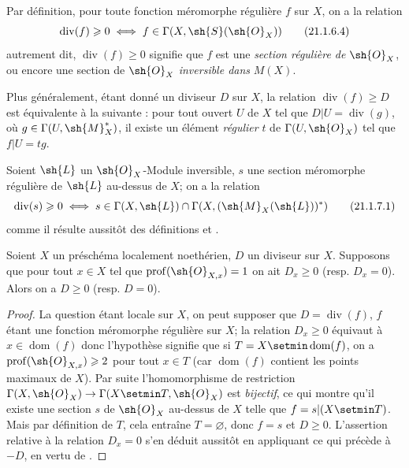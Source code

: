 Par définition, pour toute fonction méromorphe régulière $f$ sur $X$, on a la relation
\[
\label{IV.21.1.6.4}
  \operatorname{div}(f)\geq0 \iff f\in\Gamma(X,\sh{S}(\sh{O}_X))
  \tag{21.1.6.4}
\]
autrement dit, $\operatorname{div}(f)\geq0$ signifie que $f$ est une \emph{section régulière de} $\sh{O}_X$, ou encore une section de $\sh{O}_X$ \emph{inversible dans} $M(X)$.

Plus généralement, étant donné un diviseur $D$ sur $X$, la relation $\operatorname{div}(f)\geq D$ est équivalente à la suivante : pour tout ouvert $U$ de $X$ tel que $D|U=\operatorname{div}(g)$, où $g\in\Gamma(U,\sh{M}_X^*)$, il existe un élément \emph{régulier} $t$ de $\Gamma(U,\sh{O}_X)$ tel que $f|U=tg$.

\begin{env}[21.1.7]
\label{IV.21.1.7}
Soient $\sh{L}$ un $\sh{O}_X$-Module inversible, $s$ une section méromorphe régulière de $\sh{L}$ au-dessus de $X$; on a la relation
\[
\label{IV.21.1.7.1}
  \operatorname{div}(s)\geq0 \iff s\in\Gamma(X,\sh{L})\cap\Gamma(X,(\sh{M}_X(\sh{L}))^*)
  \tag{21.1.7.1}
\]
comme il résulte aussitôt des définitions  et .
\end{env}

\begin{proposition}[21.1.8]
Soient $X$ un préschéma localement noethérien, $D$ un diviseur sur $X$.
Supposons que pour tout $x\in X$ tel que $\operatorname{prof}(\sh{O}_{X,x})=1$ on ait $D_x\geq0$ \textup{(resp. $D_x=0$)}.
Alors on a $D\geq0$ \textup{(resp. $D=0$)}.
\end{proposition}

\begin{proof}
La question étant locale sur $X$, on peut supposer que $D=\operatorname{div}(f)$, $f$ étant une
fonction méromorphe régulière sur $X$;
la relation $D_x\geq0$ équivaut à $x\in\operatorname{dom}(f)$ donc l'hypothèse signifie que si $T=X\setmin\operatorname{dom}(f)$, on a $\operatorname{prof}(\sh{O}_{X,x})\geq2$ pour tout $x\in T$ (car $\operatorname{dom}(f)$ contient les points maximaux de $X$).
Par suite  l'homomorphisme de restriction $\Gamma(X,\sh{O}_X)\to\Gamma(X\setmin T,\sh{O}_X)$ est \emph{bijectif}, ce qui montre qu'il existe une section $s$ de $\sh{O}_X$ au-dessus de $X$ telle que $f=s|(X\setmin T)$.
Mais par définition de $T$, cela entraîne $T=\varnothing$, donc $f=s$ et $D\geq0$.
L'assertion relative à la relation $D_x=0$ s'en déduit aussitôt en appliquant ce qui précède à $-D$, en vertu de .
\end{proof}


